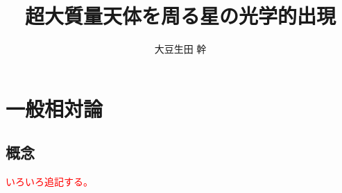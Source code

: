 \documentclass[dvipdfmx]{report} %
\title{超大質量天体を周る星の光学的出現}
\author{大豆生田 幹}
\date{}
\begin{document}
\maketitle %
\tableofcontents %
\fontsize{11pt}{11pt}\selectfont %

\chapter{一般相対論}


\section{概念}
\textcolor{red}{いろいろ追記する。}

\end{document}
